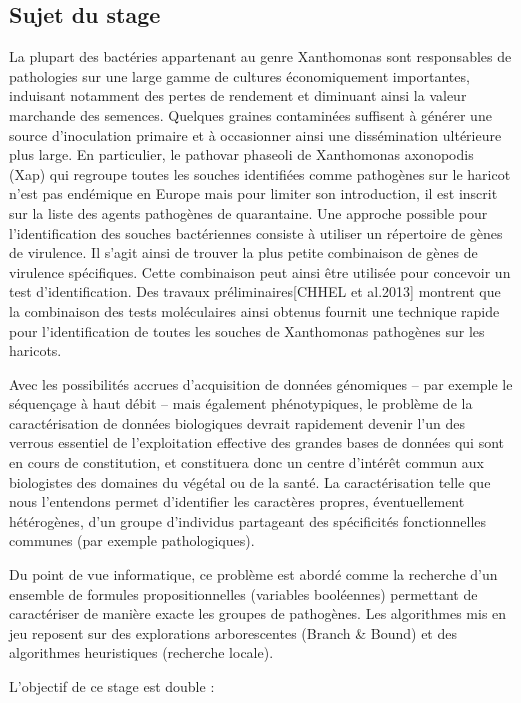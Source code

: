 \documentclass[a4paper,10pt]{article}
\begin{document}
\subsection*{Sujet du stage}
\par La plupart des bactéries appartenant au genre Xanthomonas sont responsables de pathologies sur
une large gamme de cultures économiquement importantes, induisant notamment des pertes
de rendement et diminuant ainsi la valeur marchande des semences. Quelques graines
contaminées suffisent à générer une source d'inoculation primaire et à occasionner ainsi une
dissémination ultérieure plus large. En particulier, le pathovar phaseoli de Xanthomonas axonopodis
(Xap) qui regroupe toutes les souches identifiées comme pathogènes sur le haricot n'est pas
endémique en Europe mais pour limiter son introduction, il est inscrit sur la liste des agents
pathogènes de quarantaine. Une approche possible pour l'identification des souches bactériennes
consiste à utiliser un répertoire de gènes de virulence. Il s'agit ainsi de trouver la plus petite
combinaison de gènes de virulence spécifiques. Cette combinaison peut ainsi être utilisée pour
concevoir un test d'identification. Des travaux préliminaires[CHHEL et al.2013] montrent que la combinaison des
tests moléculaires ainsi obtenus fournit une technique rapide pour l'identification de toutes les
souches de Xanthomonas pathogènes sur les haricots.
\par Avec les possibilités accrues d'acquisition de données génomiques – par exemple le séquençage à
haut débit – mais également phénotypiques, le problème de la caractérisation de données
biologiques devrait rapidement devenir l'un des verrous essentiel de l'exploitation effective des
grandes bases de données qui sont en cours de constitution, et constituera donc un centre d'intérêt
commun aux biologistes des domaines du végétal ou de la santé. La caractérisation telle que nous
l'entendons permet d'identifier les caractères propres, éventuellement hétérogènes, d'un groupe
d’individus partageant des spécificités fonctionnelles communes (par exemple pathologiques).
\par Du point de vue informatique, ce problème est abordé comme la recherche d'un ensemble de
formules propositionnelles (variables booléennes) permettant de caractériser de manière exacte les
groupes de pathogènes. Les algorithmes mis en jeu reposent sur des explorations arborescentes
(Branch \& Bound) et des algorithmes heuristiques (recherche locale).
\par L'objectif de ce stage est double :
\end{document}

